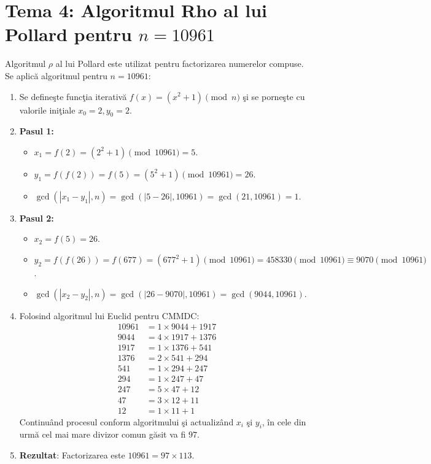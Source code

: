 \documentclass[12pt, a4paper]{article}
\begin{document}
\newpage

\section*{Tema 4: Algoritmul Rho al lui Pollard pentru $n = 10961$}

Algoritmul $\rho$ al lui Pollard este utilizat pentru factorizarea numerelor compuse. Se aplic\u{a} algoritmul pentru $n = 10961$:

\begin{enumerate}
    \item Se define\c{s}te func\c{t}ia iterativ\u{a} $f(x) = (x^2 + 1) \pmod n$ \c{s}i se porne\c{s}te cu valorile ini\c{t}iale $x_0 = 2, y_0 = 2$.
    \item \textbf{Pasul 1:}
    \begin{itemize}
        \item $x_1 = f(2) = (2^2 + 1) \pmod{10961} = 5$.
        \item $y_1 = f(f(2)) = f(5) = (5^2 + 1) \pmod{10961} = 26$.
        \item $\gcd(|x_1 - y_1|, n) = \gcd(|5 - 26|, 10961) = \gcd(21, 10961) = 1$.
    \end{itemize}
    \item \textbf{Pasul 2:}
    \begin{itemize}
        \item $x_2 = f(5) = 26$.
        \item $y_2 = f(f(26)) = f(677) = (677^2 + 1) \pmod{10961} = 458330 \pmod{10961} \equiv 9070 \pmod{10961}$.
        \item $\gcd(|x_2 - y_2|, n) = \gcd(|26 - 9070|, 10961) = \gcd(9044, 10961)$.
    \end{itemize}
    \item Folosind algoritmul lui Euclid pentru CMMDC:
    \begin{align*}
        10961 &= 1 \times 9044 + 1917 \\
        9044 &= 4 \times 1917 + 1376 \\
        1917 &= 1 \times 1376 + 541 \\
        1376 &= 2 \times 541 + 294 \\
        541 &= 1 \times 294 + 247 \\
        294 &= 1 \times 247 + 47 \\
        247 &= 5 \times 47 + 12 \\
        47 &= 3 \times 12 + 11 \\
        12 &= 1 \times 11 + 1
    \end{align*}
    Continu\^{a}nd procesul conform algoritmului \c{s}i actualiz\^{a}nd $x_i$ \c{s}i $y_i$, \^{i}n cele din urm\u{a} cel mai mare divizor comun g\u{a}sit va fi $97$. 
    \item \textbf{Rezultat}: Factorizarea este $10961 = 97 \times 113$.
\end{enumerate}
\end{document}
